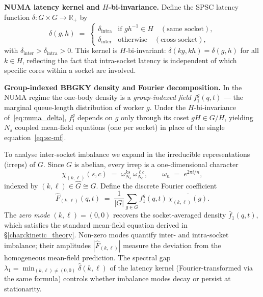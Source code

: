 \documentclass[11pt,a4paper]{report}
\begin{document}
\medskip
\noindent\textbf{NUMA latency kernel and $H$-bi-invariance.}
Define the SPSC latency function $\delta \colon G \times G \to \mathbb{R}_{+}$
by
\begin{equation}\label{eq:numa_delta}
  \delta(g,h) \;=\;
  \begin{cases}
    \delta_{\mathrm{intra}} & \text{if } gh^{-1} \in H
                              \quad (\text{same socket}), \\
    \delta_{\mathrm{inter}} & \text{otherwise}
                              \quad (\text{cross-socket}),
  \end{cases}
\end{equation}
with $\delta_{\mathrm{inter}} > \delta_{\mathrm{intra}} > 0$.
This kernel is $H$-bi-invariant: $\delta(kg, kh) = \delta(g,h)$ for all
$k \in H$, reflecting the fact that intra-socket latency is independent of
which specific cores within a socket are involved.

\medskip
\noindent\textbf{Group-indexed BBGKY density and Fourier decomposition.}
In the NUMA regime the one-body density is a \emph{group-indexed field}
$f_1^g(q,t)$ --- the marginal queue-length distribution of worker $g$.
Under the $H$-bi-invariance of~\eqref{eq:numa_delta}, $f_1^g$ depends on
$g$ only through its coset $gH \in G/H$, yielding $N_s$ coupled mean-field
equations (one per socket) in place of the single equation~\eqref{eq:sc-mf}.

To analyse inter-socket imbalance we expand in the irreducible
representations (irreps) of $G$.  Since $G$ is abelian, every irrep is a
one-dimensional character
\[
  \chi_{(k,\ell)}(s,c) \;=\; \omega_{N_s}^{ks}\,\omega_{N_c}^{\ell c},
  \qquad
  \omega_n \;=\; e^{2\pi i/n},
\]
indexed by $(k,\ell) \in \hat G \cong G$.  Define the discrete Fourier
coefficient
\begin{equation}\label{eq:numa_fourier}
  \hat{F}_{(k,\ell)}(q,t)
  \;=\;
  \frac{1}{|G|}\sum_{g \in G} f_1^g(q,t)\,\overline{\chi_{(k,\ell)}(g)}.
\end{equation}
The \emph{zero mode} $(k,\ell) = (0,0)$ recovers the socket-averaged density
$\bar f_1(q,t)$, which satisfies the standard mean-field equation derived in
\S\ref{chap:kinetic_theory}.  Non-zero modes quantify inter- and intra-socket imbalance;
their amplitudes $|\hat{F}_{(k,\ell)}|$ measure the deviation from the
homogeneous mean-field prediction.  The spectral gap
$\lambda_1 = \min_{(k,\ell)\neq(0,0)} \hat\delta(k,\ell)$
of the latency kernel (Fourier-transformed via the same formula) controls
whether imbalance modes decay or persist at stationarity.
\end{document}
